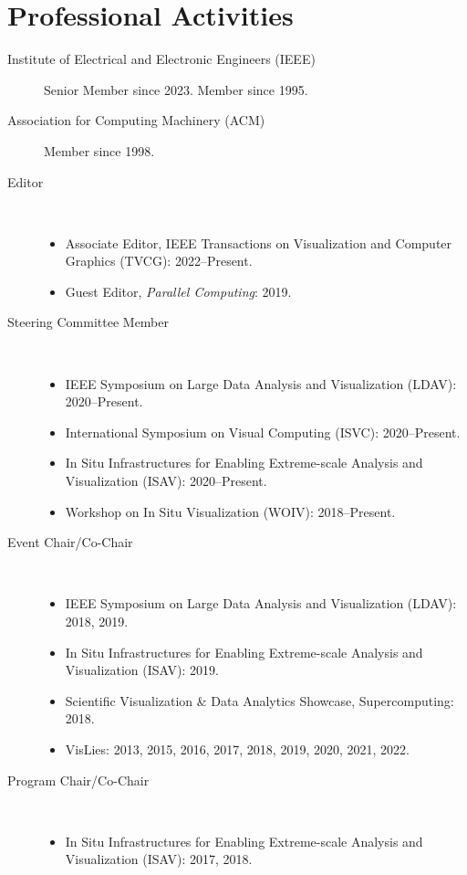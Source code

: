 \documentclass{article}
\begin{document}
\section*{Professional Activities}

\begin{description}
\item[Institute of Electrical and Electronic Engineers (IEEE)]
  Senior Member since 2023. Member since 1995.
\item[Association for Computing Machinery (ACM)]  Member since 1998.
\item[Editor]~
  \begin{itemize}
  \item
    Associate Editor, IEEE Transactions on Visualization and Computer Graphics (TVCG): 2022--Present.
  \item
    Guest Editor, \emph{Parallel Computing}: 2019.
  \end{itemize}
\item[Steering Committee Member]~
  \begin{itemize}
  \item
    IEEE Symposium on Large Data Analysis and Visualization (LDAV): 2020--Present.
  \item
    International Symposium on Visual Computing (ISVC): 2020--Present.
  \item
    In Situ Infrastructures for Enabling Extreme-scale Analysis and Visualization (ISAV): 2020--Present.
  \item
    Workshop on In Situ Visualization (WOIV): 2018--Present.
  \end{itemize}
\item[Event Chair/Co-Chair]~
  \begin{itemize}
  \item
    IEEE Symposium on Large Data Analysis and Visualization (LDAV): 2018, 2019.
  \item
    In Situ Infrastructures for Enabling Extreme-scale Analysis and Visualization (ISAV): 2019.
  \item
    Scientific Visualization \& Data Analytics Showcase, Supercomputing: 2018.
  \item
    VisLies: 2013, 2015, 2016, 2017, 2018, 2019, 2020, 2021, 2022.
  \end{itemize}
\item[Program Chair/Co-Chair]~
  \begin{itemize}
  \item
    In Situ Infrastructures for Enabling Extreme-scale Analysis and Visualization (ISAV): 2017, 2018.

\end{itemize}
\end{description}
\end{document}
